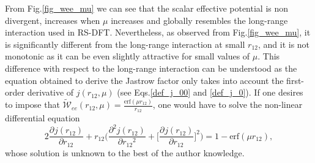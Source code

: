 \documentclass[aip,jcp,reprint,noshowkeys,superscriptaddress]{revtex4-1}
\newcommand{\deriv}[3]{\frac{\partial^{#3} #1}{\partial {#2}^{#3}}}
\begin{document}
From  Fig.\ref{fig_wee_mu} we can see that the scalar effective potential 
is non divergent, increases when $\mu$ increases and globally resembles the long-range interaction used in RS-DFT. 
Nevertheless, as observed from Fig.\ref{fig_wee_mu}, it is significantly different 
from the long-range interaction at small $r_{12}$, 
and it is not monotonic as it can be even slightly attractive for small values of $\mu$. 
This difference with respect to the long-range interaction can be understood as the equation obtained to derive the Jastrow factor only takes into account the first-order derivative of $j(r_{12},\mu)$ (see Eqs.\eqref{def_j_00} and \eqref{def_j_0}). 
If one desires to impose that $\tilde{\mathcal{W}}_{ee}(r_{12},\mu) = \frac{\text{erf}(\mu r_{12})}{r_{12}}$, one would have to solve the non-linear differential equation 
\begin{equation}
 2 \deriv{j(r_{12})}{r_{12}}{} + r_{12} \bigg( \deriv{j(r_{12})}{r_{12}}{2} + \bigg[ \deriv{j(r_{12})}{r_{12}}{} \bigg]^2\bigg) = 1 - \text{erf}(\mu r_{12}), 
\end{equation}
whose solution is unknown to the best of the author knowledge. 
\end{document}
